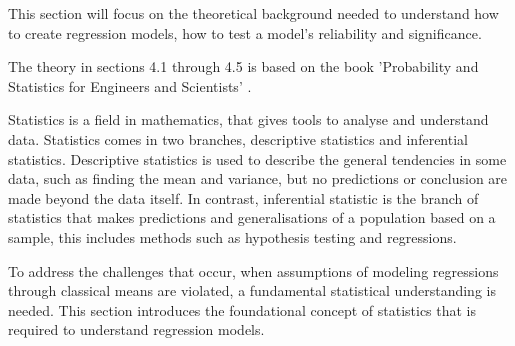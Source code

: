 This section will focus on the theoretical background needed to understand how to create regression models, how to test a model's reliability and significance.

\noindent The theory in sections 4.1 through 4.5 is based on the book 'Probability and Statistics for Engineers and Scientists' \cite{ProbAndStat}. \newline

\noindent Statistics is a field in mathematics, that gives tools to analyse and understand data. Statistics comes in two branches, descriptive statistics and inferential statistics. Descriptive statistics is used to describe the general tendencies in some data, such as finding the mean and variance, but no predictions or conclusion are made beyond the data itself. In contrast, inferential statistic is the branch of statistics that makes predictions and generalisations of a population based on a sample, this includes methods such as hypothesis testing and regressions. \newline

\noindent To address the challenges that occur, when  assumptions of modeling regressions through classical means are violated, a fundamental statistical understanding is needed. This section introduces the foundational concept of statistics that is required to understand regression models.






\newpage

